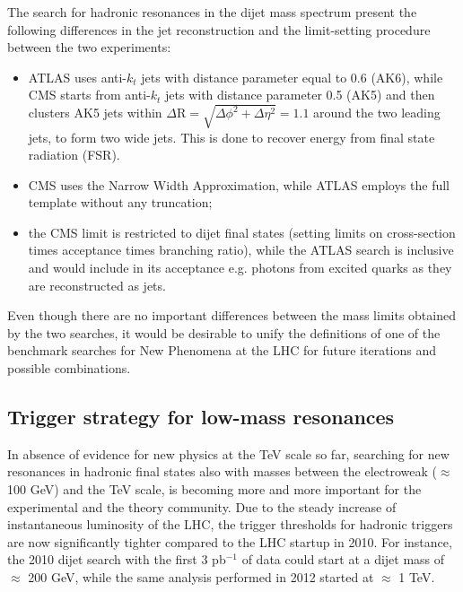 \documentclass{PoS}
\newcommand{\antikt}{anti-$k_t$}
\begin{document}
The search for hadronic resonances in the dijet mass spectrum present 
the following differences in the jet reconstruction and the limit-setting procedure between the two experiments:
\begin{itemize}
\item ATLAS uses \antikt{} jets with distance parameter equal to 0.6 (AK6), while 
CMS starts from  \antikt{} jets with distance parameter 0.5
(AK5) and then clusters AK5 jets within $\Delta\mbox{R}=\sqrt{\Delta\phi^2+\Delta\eta^2}=1.1$ around the two leading jets, to form two wide jets. This is done to recover energy from final 
state radiation (FSR).
 \item CMS uses the Narrow Width Approximation, while ATLAS employs the full template without any truncation;
 \item the CMS limit is restricted to dijet final states (setting limits on cross-section times acceptance times branching ratio), while the ATLAS search is inclusive and would include in its acceptance e.g. photons from excited quarks as they are reconstructed as jets. 
\end{itemize}
Even though there are no important differences between the mass limits obtained by the two searches, 
it would be desirable to unify the definitions of one of the benchmark searches for New Phenomena at the LHC
for future iterations and possible combinations. 

\subsection{Trigger strategy for low-mass resonances}
In absence of evidence for new physics at the TeV scale so far, 
searching for new resonances in hadronic final states also with masses 
between the electroweak ($\approx$ 100 GeV) and the TeV scale, 
is becoming more and more important for the experimental and the theory community.
Due to the steady increase of instantaneous luminosity of the LHC, 
the trigger thresholds for hadronic triggers are now significantly 
tighter compared to the LHC startup in 2010. For instance, the 2010 
dijet search with the first  3 pb$^{-1}$ of data could start at a dijet mass 
of $\approx$ 200 GeV, while the same analysis performed in 2012 
started at $\approx$ 1 TeV.
\end{document}
